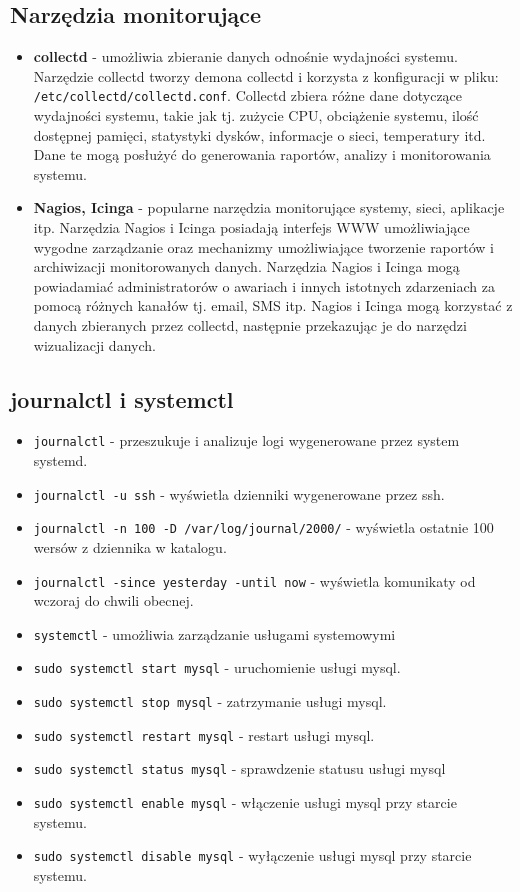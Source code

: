 \documentclass{article}
\begin{document}
\newpage \subsection{Narzędzia monitorujące}
\begin{itemize}
    \item \textbf{collectd} - umożliwia zbieranie danych odnośnie wydajności systemu. Narzędzie collectd tworzy demona collectd i korzysta z konfiguracji w pliku: \newline\texttt{/etc/collectd/collectd.conf}. Collectd zbiera różne dane dotyczące wydajności systemu, takie jak tj. zużycie CPU, obciążenie systemu, ilość dostępnej pamięci, statystyki dysków, informacje o sieci, temperatury itd. Dane te mogą posłużyć do generowania raportów, analizy i monitorowania systemu.
    \item \textbf{Nagios, Icinga} - popularne narzędzia monitorujące systemy, sieci, aplikacje itp. Narzędzia Nagios i Icinga posiadają interfejs WWW umożliwiające wygodne zarządzanie oraz mechanizmy umożliwiające tworzenie raportów i archiwizacji monitorowanych danych. Narzędzia Nagios i Icinga mogą powiadamiać administratorów o awariach i innych istotnych zdarzeniach za pomocą różnych kanałów tj. email, SMS itp. Nagios i Icinga mogą korzystać z danych zbieranych przez collectd, następnie przekazując je do narzędzi wizualizacji danych.
\end{itemize}

\subsection{journalctl i systemctl}
\begin{itemize}
    \item \texttt{journalctl} - przeszukuje i analizuje logi wygenerowane przez system systemd.
    \item \texttt{journalctl -u ssh} - wyświetla dzienniki wygenerowane przez ssh.
    \item \texttt{journalctl -n 100 -D /var/log/journal/2000/} - wyświetla ostatnie 100 wersów z dziennika w katalogu.
    \item \texttt{journalctl -since yesterday -until now} - wyświetla komunikaty od wczoraj do chwili obecnej.
    \item \texttt{systemctl} - umożliwia zarządzanie usługami systemowymi
    \item \texttt{sudo systemctl start mysql} - uruchomienie usługi mysql.
    \item \texttt{sudo systemctl stop mysql} - zatrzymanie usługi mysql.
    \item \texttt{sudo systemctl restart mysql} - restart usługi mysql.
    \item \texttt{sudo systemctl status mysql} - sprawdzenie statusu usługi mysql
    \item \texttt{sudo systemctl enable mysql} - włączenie usługi mysql przy starcie systemu.
    \item \texttt{sudo systemctl disable mysql} - wyłączenie usługi mysql przy starcie systemu.
\end{itemize}
\end{document}
